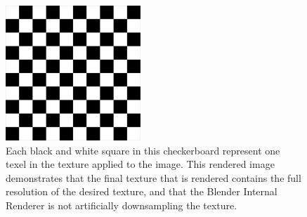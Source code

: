 \begin{figure}[H]
	\centering
	\includegraphics[height = 2in]{../fig/texres.png}
	
	\caption{Each black and white square in this checkerboard represent one texel in the texture applied to the image.  This rendered image demonstrates that the final texture that is rendered contains the full resolution of the desired texture, and that the Blender Internal Renderer is not artificially downsampling the texture.}
	\label{fig:texres}
\end{figure}